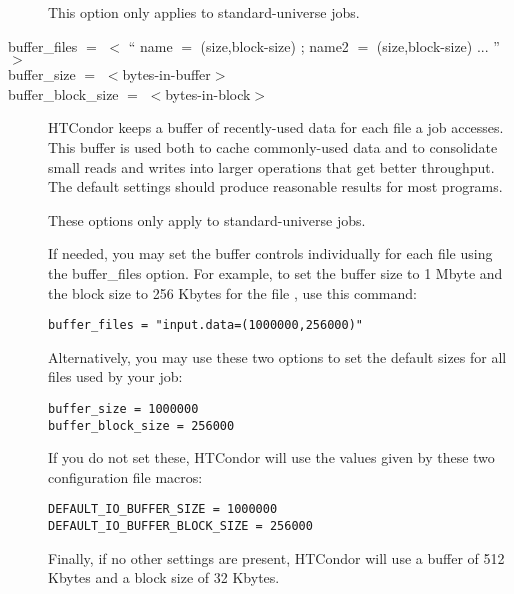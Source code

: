 \begin{description}
This option only applies to standard-universe jobs.


\label{condor-submit-buffer-files}
\label{condor-submit-buffer-size}
\label{condor-submit-buffer-block-size}
\item[buffer\_files $=$ $<$ `` name $=$ (size,block-size) ; name2 $=$ (size,block-size) ... '' $>$ ]
\item[buffer\_size $=$ $<$bytes-in-buffer$>$]
\item[buffer\_block\_size $=$ $<$bytes-in-block$>$]
HTCondor keeps a buffer of recently-used data for each file a job accesses.
This buffer is used both to cache commonly-used data and to consolidate small
reads and writes into larger operations that get better throughput.
The default settings should produce reasonable results for most programs.

These options only apply to standard-universe jobs.

If needed, you may set the buffer controls individually for each file using
the buffer\_files option. For example, to set the buffer size to 1 Mbyte and
the block size to 256 Kbytes for the file , use this command:

\begin{verbatim}
buffer_files = "input.data=(1000000,256000)"
\end{verbatim}

Alternatively, you may use these two options to set
the default sizes for all files used by your job:

\begin{verbatim}
buffer_size = 1000000
buffer_block_size = 256000
\end{verbatim}

If you do not set these, HTCondor will use the values given by these
two configuration file macros:

\begin{verbatim}
DEFAULT_IO_BUFFER_SIZE = 1000000
DEFAULT_IO_BUFFER_BLOCK_SIZE = 256000
\end{verbatim}

Finally, if no other settings are present, HTCondor will use
a buffer of 512 Kbytes
and a block size of 32 Kbytes.



\end{description}
